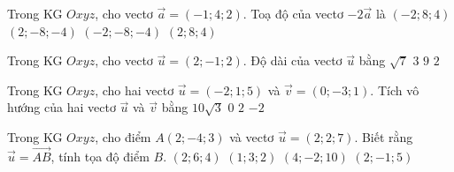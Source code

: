 \begin{ex}%
Trong KG $Oxyz$, cho vectơ $\overrightarrow{a}=(-1;4;2)$. Toạ độ của vectơ $-2\overrightarrow{a}$ là
\choice
{$(-2;8;4)$}
{\True $(2;-8;-4)$}
{$(-2;-8;-4)$}
{$(2;8;4)$}
\end{ex}

\begin{ex}%
Trong KG $Oxyz$, cho vectơ $\overrightarrow{u}=(2;-1;2)$. Độ dài của vectơ $\overrightarrow{u}$ bằng
\choice
{$\sqrt{7}$}
{\True $3$}
{$9$}
{$2$}
\end{ex}

\begin{ex}%
Trong KG $Oxyz$, cho hai vectơ $\overrightarrow{u}=(-2;1;5)$ và $\overrightarrow{v}=(0;-3;1)$. Tích vô hướng của hai vectơ $\overrightarrow{u}$ và $\overrightarrow{v}$ bằng
\choice
{$10\sqrt{3}$}
{$0$}
{\True $2$}
{$-2$}
\end{ex}

\begin{ex}%
Trong KG $Oxyz$, cho điểm $A(2;-4;3)$ và vectơ $\overrightarrow{u}=(2;2;7)$. Biết rằng $\overrightarrow{u}=\overrightarrow{AB}$, tính tọa độ điểm $B$.
\choice
{$(2;6;4)$}
{$(1;3;2)$}
{\True $(4;-2;10)$}
{$(2;-1;5)$}
\end{ex}

